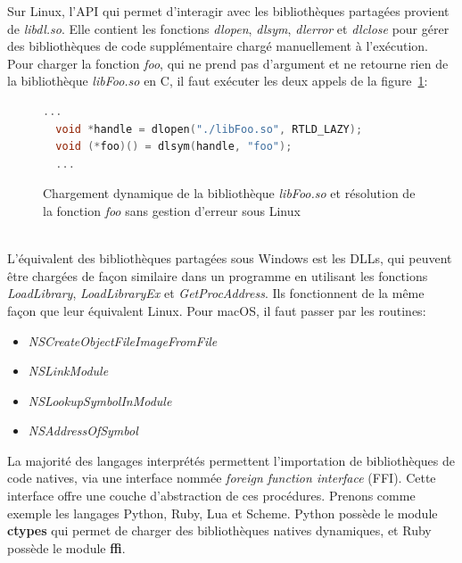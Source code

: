 Sur Linux, l'API qui permet d'interagir avec les bibliothèques partagées provient de \textit{libdl.so}.
Elle contient les fonctions \textit{dlopen}, \textit{dlsym}, \textit{dlerror} et \textit{dlclose} pour gérer
des bibliothèques de code supplémentaire chargé manuellement à l'exécution.  Pour charger la fonction
\textit{foo}, qui ne prend pas d'argument et ne retourne rien de la bibliothèque \textit{libFoo.so} en C,
il faut exécuter les deux appels de la figure~\ref{fig:dlsym_dlopen}:
\begin{figure}[ht]
  \centering
\begin{lstlisting}[language=C,frame=single]
  ...
  void *handle = dlopen("./libFoo.so", RTLD_LAZY);
  void (*foo)() = dlsym(handle, "foo");
  ...
\end{lstlisting}
  \caption{Chargement dynamique de la bibliothèque \textit{libFoo.so} et
    résolution de la fonction \textit{foo} sans gestion d'erreur sous Linux}
    \label{fig:dlsym_dlopen}
\end{figure}\\
L'équivalent des bibliothèques partagées sous Windows est les DLLs, qui peuvent
être chargées de façon similaire dans un programme en utilisant les fonctions
\textit{LoadLibrary}, \textit{LoadLibraryEx} et \textit{GetProcAddress}. Ils
fonctionnent de la même façon que leur équivalent Linux. Pour macOS, il faut
passer par les routines:
\begin{itemize}
    \item \textit{NSCreateObjectFileImageFromFile}
    \item \textit{NSLinkModule}
    \item \textit{NSLookupSymbolInModule}
    \item \textit{NSAddressOfSymbol}
\end{itemize}

La majorité des langages interprétés permettent l'importation de bibliothèques
de code natives, via une interface nommée \textit{foreign function interface}
(FFI).  Cette interface offre une couche d'abstraction de ces procédures.
Prenons comme exemple les langages Python, Ruby, Lua et Scheme. Python possède
le module \textbf{ctypes} qui permet de charger des bibliothèques natives
dynamiques, et Ruby possède le module \textbf{ffi}.


